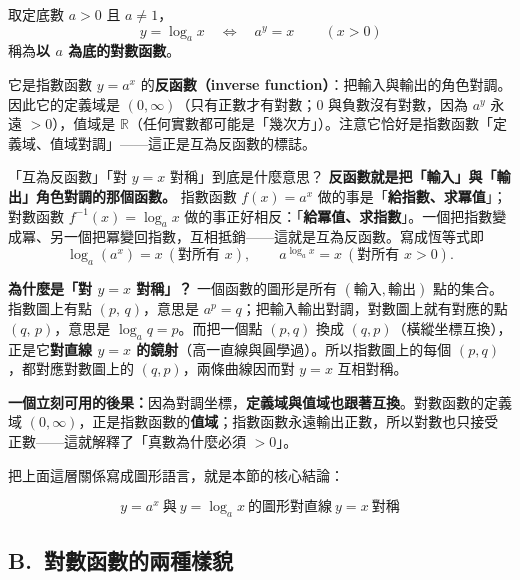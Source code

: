 \documentclass[11pt]{article}
\begin{document}
\begin{center}
取定底數 $a>0$ 且 $a\ne 1$，
$$\boxed{\,y=\log_{a}x\quad\Longleftrightarrow\quad a^{y}=x\,}\qquad (x>0)$$
稱為\textbf{以 $a$ 為底的對數函數}。
\end{center}

它是指數函數 $y=a^x$ 的\textbf{反函數（inverse function）}：把輸入與輸出的角色對調。因此它的定義域是 $(0,\infty)$（只有正數才有對數；$0$ 與負數沒有對數，因為 $a^y$ 永遠 $>0$），值域是 $\mathbb{R}$（任何實數都可能是「幾次方」）。注意它恰好是指數函數「定義域、值域對調」——這正是互為反函數的標誌。

\begin{補充框}{「互為反函數」「對 $y=x$ 對稱」到底是什麼意思？}
\textbf{反函數就是把「輸入」與「輸出」角色對調的那個函數。} 指數函數 $f(x)=a^{x}$ 做的事是「\textbf{給指數、求冪值}」；對數函數 $f^{-1}(x)=\log_a x$ 做的事正好相反：「\textbf{給冪值、求指數}」。一個把指數變成冪、另一個把冪變回指數，互相抵銷——這就是互為反函數。寫成恆等式即
$$\log_a\!\left(a^{x}\right)=x\ (\text{對所有 }x),\qquad a^{\log_a x}=x\ (\text{對所有 }x>0).$$

\textbf{為什麼是「對 $y=x$ 對稱」？} 一個函數的圖形是所有 $(\text{輸入},\text{輸出})$ 點的集合。指數圖上有點 $(p,\,q)$，意思是 $a^{p}=q$；把輸入輸出對調，對數圖上就有對應的點 $(q,\,p)$，意思是 $\log_a q=p$。而把一個點 $(p,q)$ 換成 $(q,p)$（橫縱坐標互換），正是它\textbf{對直線 $y=x$ 的鏡射}（高一直線與圓學過）。所以指數圖上的每個 $(p,q)$，都對應對數圖上的 $(q,p)$，兩條曲線因而對 $y=x$ 互相對稱。

\textbf{一個立刻可用的後果：}因為對調坐標，\textbf{定義域與值域也跟著互換}。對數函數的定義域 $(0,\infty)$，正是指數函數的\textbf{值域}；指數函數永遠輸出正數，所以對數也只接受正數——這就解釋了「真數為什麼必須 $>0$」。
\end{補充框}

把上面這層關係寫成圖形語言，就是本節的核心結論：

\begin{center}
$$\boxed{\,y=a^{x}\ \text{與}\ y=\log_{a}x\ \text{的圖形對直線}\ y=x\ \text{對稱}\,}$$
\end{center}


\subsection*{\sffamily B.\ 對數函數的兩種樣貌}
\end{document}
